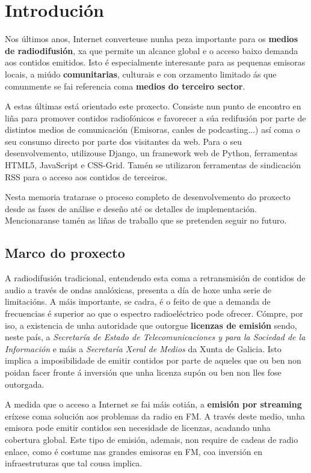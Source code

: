 \chapter[Introdución]{
  \label{chp:introduccion}
  Introdución
}
\minitoc
\newpage

Nos últimos anos, Internet converteuse nunha peza importante para os \textbf{medios de radiodifusión}, xa que permite un alcance global e o acceso baixo demanda aos contidos emitidos. Isto é especialmente interesante para as pequenas emisoras locais, a miúdo \textbf{comunitarias}, culturais e con orzamento limitado ás que comunmente se fai referencia coma \textbf{medios do terceiro sector}.

A estas últimas está orientado este proxecto. Consiste nun punto de encontro en liña para promover contidos radiofónicos e favorecer a súa redifusión por parte de distintos medios de comunicación (Emisoras, canles de podcasting...) así coma o seu consumo directo por parte dos visitantes da web. Para o seu desenvolvemento, utilizouse Django, un framework web de Python, ferramentas HTML5, JavaScript e CSS-Grid. Tamén se utilizaron ferramentas de sindicación RSS para o acceso aos contidos de terceiros.

Nesta memoria tratarase o proceso completo de desenvolvemento do proxecto desde as fases de análise e deseño até os detalles de implementación. Mencionaranse tamén as liñas de traballo que se pretenden seguir no futuro.

\section{Marco do proxecto}


A radiodifusión tradicional, entendendo esta coma a retransmisión de contidos de audio a través de ondas analóxicas, presenta a día de hoxe unha serie de limitacións. A máis importante, se cadra, é o feito de que a demanda de frecuencias é superior ao que o espectro radioeléctrico pode ofrecer. Cómpre, por iso, a existencia de unha autoridade que outorgue \textbf{licenzas de emisión} sendo, neste país, a \textit{Secretaría de Estado de Telecomunicaciones y para la Sociedad de la Información} e máis a \textit{Secretaría Xeral de Medios} da Xunta de Galicia\cite{BOE}. Isto implica a imposibilidade de emitir contidos por parte de aqueles que ou ben non poidan facer fronte á inversión que unha licenza supón ou ben non lles fose outorgada.

A medida que o acceso a Internet se fai máis cotián, a \textbf{emisión por streaming} eríxese coma solución aos problemas da radio en FM. A través deste medio, unha emisora pode emitir contidos sen necesidade de licenzas, acadando unha cobertura global. Este tipo de emisión, ademais, non require de cadeas de radio enlace, como é costume nas grandes emisoras en FM, coa inversión en infraestruturas que tal cousa implica.

